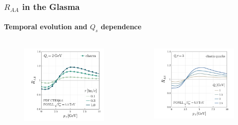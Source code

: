 \documentclass[aspectratio=169,11pt,usenames,dvipsnames]{beamer}
\begin{document}
\begin{frame}
    \frametitle{$R_{AA}$ in the Glasma}
    \framesubtitle{Temporal evolution and $Q_s$ dependence}
    \vspace{-5pt}
    \begin{center}
        \begin{columns}[onlytextwidth,t]
           \begin{figure}
                \centering
                \includegraphics[width=\columnwidth]{images/clean_raa_tau_dep_quarks_charmQs_2.0_fonll_energy_5500_pdf_cteq.png}
            \end{figure}
            \vspace{-20pt}
            \begin{figure}
                \centering
                \includegraphics[width=1.01\columnwidth]{images/clean_raa_tau_dep_charm_quark_Qs_dep.png}

\end{figure}
\end{columns}
\end{center}
\end{frame}
\end{document}

